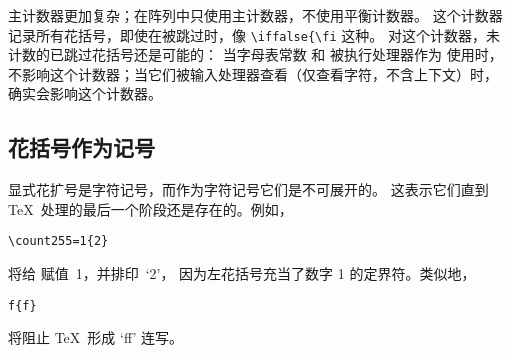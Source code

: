 \documentclass{book}
\begin{document}
主计数器更加复杂；在阵列中只使用主计数器，不使用平衡计数器。
这个计数器记录所有花括号，即使在被跳过时，像 \verb>\iffalse{\fi> 这种。
对这个计数器，未计数的已跳过花括号还是可能的：
当字母表常数  和  被执行处理器作为  使用时，
不影响这个计数器；当它们被输入处理器查看（仅查看字符，不含上下文）时，
确实会影响这个计数器。

\subsection{花括号作为记号}

显式花扩号是字符记号，而作为字符记号它们是不可展开的。
这表示它们直到 \TeX\ 处理的最后一个阶段还是存在的。例如，
\begin{verbatim}
\count255=1{2}
\end{verbatim}
将给  赋值~1，并排印~`2'，
因为左花括号充当了数字 1 的定界符。类似地，
\begin{verbatim}
f{f}
\end{verbatim}
将阻止 \TeX\ 形成 `\hbox{ff}' 连写。
\end{document}
